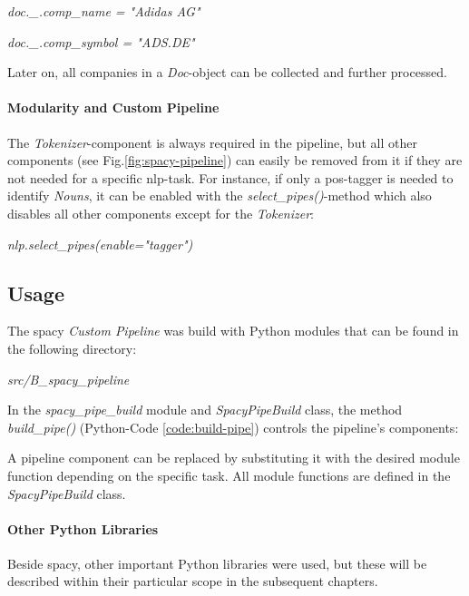 \begin{center}
    \emph{doc.\_.comp\_name = "Adidas AG"}
\end{center}
\begin{center}
    \emph{doc.\_.comp\_symbol = "ADS.DE"}
\end{center}

Later on, all companies in a \textit{Doc}-object can be collected and further processed.

\paragraph{Modularity and Custom Pipeline}
The \emph{Tokenizer}-component is always required in the pipeline, but all other components (see Fig.\ref{fig:spacy-pipeline}) can easily be removed from it if they are not needed for a specific \gls{nlp}-task.
For instance, if only a \gls{pos}-tagger is needed to identify \emph{Nouns}, it can be enabled with the \emph{select\_pipes()}-method which also disables all other components except for the \emph{Tokenizer}:

\begin{center}
\emph{nlp.select\_pipes(enable="tagger")}
\end{center}

\subsection{Usage}\label{subsec:usage}
The spacy \emph{Custom Pipeline} was build with Python modules that can be found in the following directory:
\begin{center}
    \emph{src/B\_spacy\_pipeline}
\end{center}
In the \emph{spacy\_pipe\_build} module and \emph{SpacyPipeBuild} class, the method \emph{build\_pipe()} (Python-Code \ref{code:build-pipe}) controls the pipeline's components:


A pipeline component can be replaced by substituting it with the desired module function depending on the specific task.
All module functions are defined in the \emph{SpacyPipeBuild} class.

\paragraph{Other Python Libraries}
Beside spacy, other important Python libraries were used, but these will be described within their particular scope in the subsequent chapters.



